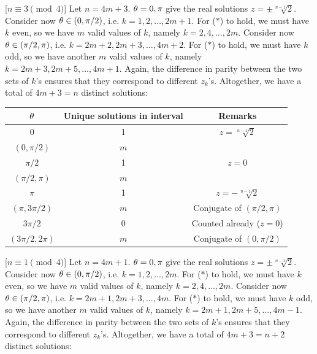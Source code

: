 \begin{solution}
    [$n \equiv 3 \pmod{4}$] Let $n = 4m + 3$. $\theta = 0, \pi$ give the real solutions $z = \pm \sqrt[n-1]{2}$. Consider now $\theta \in (0, \pi/2)$, i.e. $k = 1, 2, \dots, 2m+1$. For ($\ast$) to hold, we must have $k$ even, so we have $m$ valid values of $k$, namely $k = 2, 4, \dots, 2m.$ Consider now $\theta \in (\pi/2, \pi)$, i.e. $k = 2m+2, 2m+3, \dots, 4m+2$. For ($\ast$) to hold, we must have $k$ odd, so we have another $m$ valid values of $k$, namely $k = 2m+3, 2m+5, \dots, 4m+1$. Again, the difference in parity between the two sets of $k$'s ensures that they correspond to different $z_k$'s. Altogether, we have a total of $4m+3 = n$ distinct solutions:

    \begin{table}[H]
        \centering
        \begin{tabular}{|c|c|c|}
        \hline
        $\theta$ & Unique solutions in interval & Remarks \\ \hline\hline
        0 & 1 & $z = \sqrt[n-1]{2}$ \\ \hline
        $(0, \pi/2)$ & $m$ &  \\ \hline
        $\pi/2$ & 1 & $z = 0$ \\ \hline
        $(\pi/2, \pi)$ & $m$ &  \\ \hline
        $\pi$ & 1 & $z = -\sqrt[n-1]{2}$ \\ \hline
        $(\pi, 3\pi/2)$ & $m$ &  Conjugate of $(\pi/2, \pi)$\\ \hline
        $3\pi/2$ & 0 & Counted already ($z = 0$) \\ \hline
        $(3\pi/2, 2\pi)$ & $m$ & Conjugate of $(0, \pi/2)$ \\ \hline
        \end{tabular}
    \end{table}

    [$n \equiv 1 \pmod{4}$] Let $n = 4m + 1$. $\theta = 0, \pi$ give the real solutions $z = \pm \sqrt[n-1]{2}$. Consider now $\theta \in (0, \pi/2)$, i.e. $k = 1, 2, \dots, 2m$. For ($\ast$) to hold, we must have $k$ even, so we have $m$ valid values of $k$, namely $k = 2, 4, \dots, 2m$. Consider now $\theta \in (\pi/2, \pi)$, i.e. $k = 2m+1, 2m+3, \dots, 4m$. For ($\ast$) to hold, we must have $k$ odd, so we have another $m$ valid values of $k$, namely $k = 2m+1, 2m+5, \dots, 4m-1$. Again, the difference in parity between the two sets of $k$'s ensures that they correspond to different $z_k$'s. Altogether, we have a total of $4m+3 = n+2$ distinct solutions:


\end{solution}
